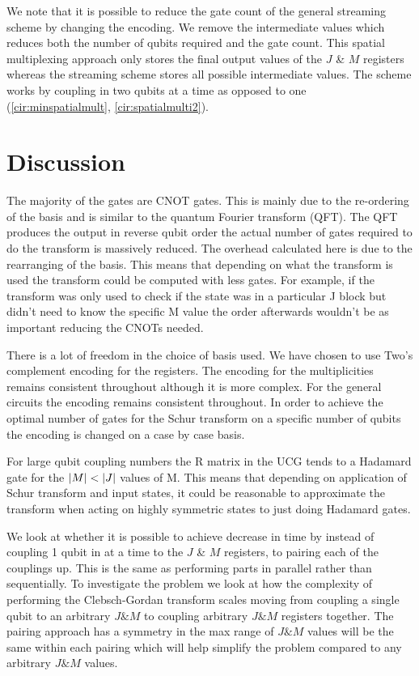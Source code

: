 \documentclass[12pt]{article}
\begin{document}
We note that it is possible to reduce the gate count of the general streaming scheme by changing the encoding. We remove the intermediate values which reduces both the number of qubits required and the gate count. This spatial multiplexing approach only stores the final output values of the $J$ \& $M$ registers whereas the streaming scheme stores all possible intermediate values. The scheme works by coupling in two qubits at a time as opposed to one (\autoref{cir:minspatialmult}, \autoref{cir:spatialmulti2}). 

\section{Discussion}

The majority of the gates are CNOT gates. This is mainly due to the re-ordering of the basis and is similar to the quantum Fourier transform (QFT). The QFT produces the output in reverse qubit order the actual number of gates required to do the transform is massively reduced. The overhead calculated here is due to the rearranging of the basis. This means that depending on what the transform is used the transform could be computed with less gates. For example, if the transform was only used to check if the state was in a particular J block but didn't need to know the specific M value the order afterwards wouldn't be as important reducing the CNOTs needed.

There is a lot of freedom in the choice of basis used. We have chosen to use Two's complement encoding for the registers. The encoding for the multiplicities remains consistent throughout although it is more complex. For the general circuits the encoding remains consistent throughout. In order to achieve the optimal number of gates for the Schur transform on a specific number of qubits the encoding is changed on a case by case basis. 

For large qubit coupling numbers the R matrix in the UCG tends to a Hadamard gate for the $\abs{M} < \abs{J}$ values of M. This means that depending on application of Schur transform and input states, it could be reasonable to approximate the transform when acting on highly symmetric states to just doing Hadamard gates.

We look at whether it is possible to achieve decrease in time by instead of coupling 1 qubit in at a time to the $J$ \& $M$ registers, to pairing each of the couplings up. This is the same as performing parts in parallel rather than sequentially. To investigate the problem we look at how the complexity of performing the Clebsch-Gordan transform scales moving from coupling a single qubit to an arbitrary $J \& M$ to coupling arbitrary $J \& M$ registers together. The pairing approach has a symmetry in the max range of $J \& M$ values will be the same within each pairing which will help simplify the problem compared to any arbitrary $J \& M$ values.
\end{document}
